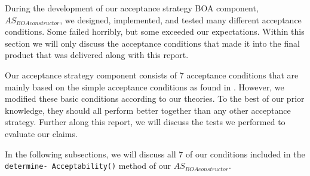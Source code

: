 During the development of our acceptance strategy BOA component, $AS_{BOAconstructor}$, we designed, implemented, and tested many different acceptance conditions. Some failed horribly, but some exceeded our expectations. Within this section we will only discuss the acceptance conditions that made it into the final product that was delivered along with this report.

Our acceptance strategy component consists of 7 acceptance conditions that are mainly based on the simple acceptance conditions as found in \cite{baarslag2013acceptance}. However, we modified these basic conditions according to our theories. To the best of our prior knowledge, they should all perform better together than any other acceptance strategy. Further along this report, we will discuss the tests we performed to evaluate our claims.

In the following subsections, we will discuss all 7 of our conditions included in the \texttt{determine- Acceptability()} method of our $AS_{BOAconstructor}$.

